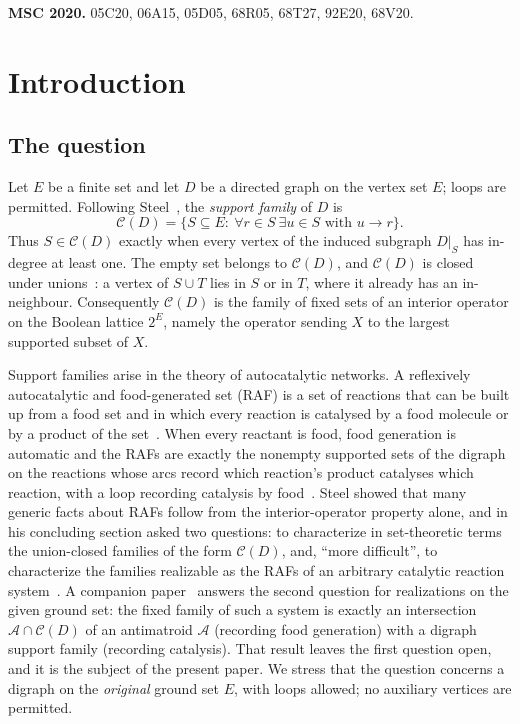 \documentclass[11pt,a4paper]{article}
\theoremstyle{plain}
\theoremstyle{definition}
\theoremstyle{remark}
\newcommand{\cA}{\mathcal A}
\newcommand{\cC}{\mathcal C}
\newcommand{\pw}[1]{2^{#1}}
\begin{document}
\medskip
\noindent\textbf{MSC 2020.} 05C20, 06A15, 05D05, 68R05, 68T27, 92E20, 68V20.

\section{Introduction}\label{sec:intro}

\subsection{The question}

Let $E$ be a finite set and let $D$ be a directed graph on the vertex set $E$; loops are permitted. Following Steel~\cite[Section~2.1]{steel2023interior}, the \emph{support family} of $D$ is
\begin{equation}\label{eq:support}
 \cC(D)=\{S\subseteq E:\ \forall r\in S\ \exists u\in S\text{ with }u\to r\}.
\end{equation}
Thus $S\in\cC(D)$ exactly when every vertex of the induced subgraph $D|_S$ has in-degree at least one. The empty set belongs to $\cC(D)$, and $\cC(D)$ is closed under unions~\cite[Proposition~2]{steel2023interior}: a vertex of $S\cup T$ lies in $S$ or in $T$, where it already has an in-neighbour. Consequently $\cC(D)$ is the family of fixed sets of an interior operator on the Boolean lattice $\pw{E}$, namely the operator sending $X$ to the largest supported subset of $X$.

Support families arise in the theory of autocatalytic networks. A reflexively autocatalytic and food-generated set (RAF) is a set of reactions that can be built up from a food set and in which every reaction is catalysed by a food molecule or by a product of the set~\cite{kauffman1986autocatalytic,hordijk2004detecting,steel2019autocatalytic}. When every reactant is food, food generation is automatic and the RAFs are exactly the nonempty supported sets of the digraph on the reactions whose arcs record which reaction's product catalyses which reaction, with a loop recording catalysis by food~\cite[Section~3.2]{steel2023interior}. Steel showed that many generic facts about RAFs follow from the interior-operator property alone, and in his concluding section asked two questions: to characterize in set-theoretic terms the union-closed families of the form $\cC(D)$, and, ``more difficult'', to characterize the families realizable as the RAFs of an arbitrary catalytic reaction system~\cite[Section~4]{steel2023interior}. A companion paper~\cite{companion2026antimatroid} answers the second question for realizations on the given ground set: the fixed family of such a system is exactly an intersection $\cA\cap\cC(D)$ of an antimatroid $\cA$ (recording food generation) with a digraph support family (recording catalysis). That result leaves the first question open, and it is the subject of the present paper. We stress that the question concerns a digraph on the \emph{original} ground set $E$, with loops allowed; no auxiliary vertices are permitted.
\end{document}

